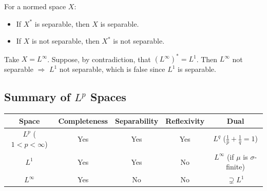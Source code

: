 \begin{remark}
For a normed space $X$:
\begin{itemize}
\item If $X^*$ is separable, then $X$ is separable.
\item If $X$ is not separable, then $X^*$ is not separable.
\end{itemize}
Take $X = L^\infty$. Suppose, by contradiction, that $(L^\infty)^* = L^1$. Then $L^\infty$ not separable $\Rightarrow$ $L^1$ not separable, which is false since $L^1$ is separable.
\end{remark}

\subsection{Summary of $L^p$ Spaces}

\begin{center}
\begin{tabular}{|c|c|c|c|c|}
\hline
Space & Completeness & Separability & Reflexivity & Dual \\
\hline
$L^p$ ($1 < p < \infty$) & Yes & Yes & Yes & $L^q$ ($\frac{1}{p} + \frac{1}{q} = 1$) \\
\hline
$L^1$ & Yes & Yes & No & $L^\infty$ (if $\mu$ is $\sigma$-finite) \\
\hline
$L^\infty$ & Yes & No & No & $\supsetneq L^1$ \\
\hline
\end{tabular}
\end{center}

